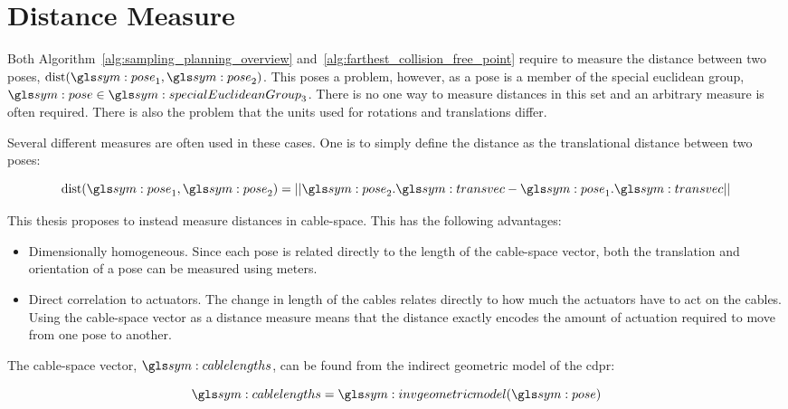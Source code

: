 \section{Distance Measure}%
\label{sec:distance_measure}

	Both Algorithm~\ref{alg:sampling_planning_overview}
	and~\ref{alg:farthest_collision_free_point} require to measure the
	distance between two poses, $\dist(\pose_1, \pose_2)$. This poses a
	problem, however, as a pose is a member of the special euclidean group,
	$\pose \in \specialEuclideanGroup{3}$. There is no one way to measure
	distances in this set and an arbitrary measure is often required. There
	is also the problem that the units used for rotations and translations
	differ.

	Several different measures are often used in these cases. One is to
	simply define the distance as the translational distance between two
	poses:

	\begin{equation}
		\dist(\pose_1, \pose_2) =
			\norm{%
				\pose_2.\transvec - \pose_1.\transvec
			}
		\label{eq:euclidean_distance}
	\end{equation}

	This thesis proposes to instead measure distances in cable-space. This
	has the following advantages:

	\begin{itemize}

		\item

			Dimensionally homogeneous. Since each pose is related directly
			to the length of the cable-space vector, both the translation
			and orientation of a pose can be measured using meters.

		\item

			Direct correlation to actuators. The change in length of the
			cables relates directly to how much the actuators have to act on
			the cables. Using the cable-space vector as a distance measure
			means that the distance exactly encodes the amount of actuation
			required to move from one pose to another.

	\end{itemize}

	The cable-space vector, $\cablelengths$, can be found from the indirect
	geometric model of the \gls{cdpr}:

	\begin{equation}
		\cablelengths = \invgeometricmodel(\pose)
	\end{equation}

